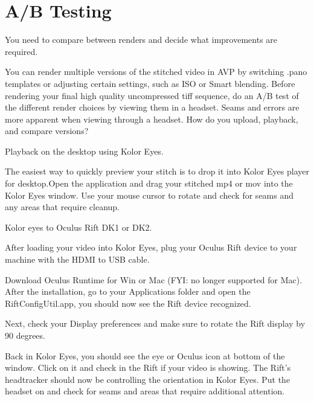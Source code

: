 \chapter{A/B Testing}
\pagecolor{white}
\label{chap:46}
\begin{fullwidth}

\problem

{\large You need to compare between renders and decide what improvements are required. \par}

You can render multiple versions of the stitched video in AVP by switching .pano templates or adjusting certain settings, such as ISO or Smart blending. Before rendering your final high quality uncompressed tiff sequence, do an A/B test of the different render choices by viewing them in a headset. Seams and errors are more apparent when viewing through a headset. How do you upload, playback, and compare versions?

\solutions

{\large Playback on the desktop using Kolor Eyes. \par}


The easiest way to quickly preview your stitch is to drop it into Kolor Eyes player for desktop.Open the application and drag your stitched mp4 or mov into the Kolor Eyes window. Use your mouse cursor to rotate and check for seams and any areas that require cleanup.

{\large Kolor eyes to Oculus Rift DK1 or DK2. \par}

After loading your video into Kolor Eyes, plug your Oculus Rift device to your machine with the HDMI to USB cable.

Download Oculus Runtime for Win or Mac (FYI: no longer supported for Mac). After the installation, go to your Applications folder and open the RiftConfigUtil.app, you should now see the Rift device recognized.


Next, check your Display preferences and make sure to rotate the Rift display by 90 degrees.


Back in Kolor Eyes, you should see the eye or Oculus icon at bottom of the window. Click on it and check in the Rift if your video is showing. The Rift’s headtracker should now be controlling the orientation in Kolor Eyes. Put the headset on and check for seams and areas that require additional attention.


\end{fullwidth}
